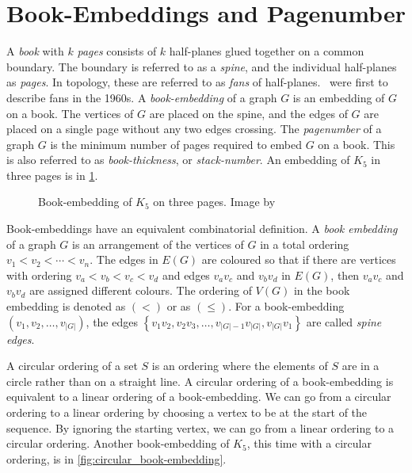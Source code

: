 \section{Book-Embeddings and Pagenumber}\label{sec:Book Embedding}
A \textit{book} with \(k\) \textit{pages} consists of \(k\) half-planes glued together on a common boundary. The boundary is referred to as a \textit{spine}, and the individual half-planes as \textit{pages}. In topology, these are referred to as \textit{fans} of half-planes.\ \textcite{persingerSubsetsNbooksE31966,atneosenEmbeddabilityCompactaNbooks} were first to describe fans in the 1960s.
A \textit{book-embedding} of a graph \(G\) is an embedding of \(G\) on a book. The vertices of \(G\) are placed on the spine, and the edges of $G$ are placed on a single page without any two edges crossing. 
The \textit{pagenumber} of a graph \(G\) is the minimum number of pages required to embed \(G\) on a book. This is also referred to as \textit{book-thickness}, or \textit{stack-number}. An embedding of $K_5$ in three pages is in \cref{fig:book-embedding}.

\begin{figure}[h!]
	\centering
	
	\caption[Three-page book-embedding of $K_5$]{Book-embedding of $K_5$ on three pages. Image by \textcite{eppsteinBookEmbedding2014}}\label{fig:book-embedding}
\end{figure}

Book-embeddings have an equivalent combinatorial definition. A \textit{book embedding} of a graph \(G\) is an arrangement of the vertices of \(G\) in a total ordering \(v_1 < v_2 < \cdots < v_n\). The edges in \(E(G)\) are coloured so that if there are vertices with ordering \(v_a < v_b < v_c < v_d\) and edges \(v_a v_c\) and \(v_b v_d\) in $E(G)$, then $v_a v_c$ and $v_b v_d$ are assigned different colours.
The ordering of \(V(G)\) in the book embedding is denoted as \((<)\) or as \((\leq)\). For a book-embedding \((v_1, v_2, \ldots, v_{|G|})\), the edges \( \left\{ v_1 v_2, v_2 v_3, \ldots, v_{|G| - 1}v_{|G|}, v_{|G|}v_{1} \right\} \) are called \textit{spine edges}.

A circular ordering of a set $S$ is an ordering where the elements of $S$ are in a circle rather than on a straight line. A circular ordering of a book-embedding is equivalent to a linear ordering of a book-embedding. We can go from a circular ordering to a linear ordering by choosing a vertex to be at the start of the sequence. By ignoring the starting vertex, we can go from a linear ordering to a circular ordering. Another book-embedding of $K_5$, this time with a circular ordering, is in \cref{fig:circular_book-embedding}.


